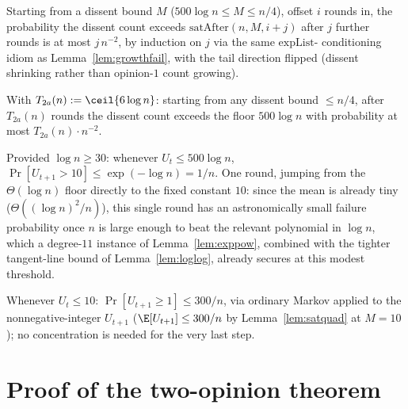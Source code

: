 \begin{lemma}\label{lem:satfail}
  \leanok
  Starting from a dissent bound $M$ ($500\log n\le M\le n/4$), offset $i$
  rounds in, the probability the dissent count exceeds
  $\mathrm{satAfter}(n,M,i+j)$ after $j$ further rounds is at most
  $j\,n^{-2}$, by induction on $j$ via the same $\mathrm{expList}$-
  conditioning idiom as Lemma~\ref{lem:growthfail}, with the tail direction
  flipped (dissent shrinking rather than opinion-$1$ count growing).
\end{lemma}

\begin{lemma}\label{lem:stage2a}
  \leanok
  With $T_{2a}(n) := \ceil{6\log n}$: starting from any dissent bound
  $\le n/4$, after $T_{2a}(n)$ rounds the dissent count exceeds the floor
  $500\log n$ with probability at most $T_{2a}(n)\cdot n^{-2}$.
\end{lemma}

\begin{lemma}[Stage 2b]\label{lem:stage2b}
  \leanok
  Provided $\log n\ge30$: whenever $U_t\le500\log n$,
  $\Pr[U_{t+1}>10] \le \exp(-\log n) = 1/n$. One round, jumping from the
  $\Theta(\log n)$ floor directly to the fixed constant $10$: since the
  mean is already tiny ($\Theta((\log n)^2/n)$), this single round has an
  astronomically small failure probability once $n$ is large enough to beat
  the relevant polynomial in $\log n$, which a degree-$11$ instance of
  Lemma~\ref{lem:exppow}, combined with the tighter tangent-line bound of
  Lemma~\ref{lem:loglog}, already secures at this modest threshold.
\end{lemma}

\begin{lemma}[Stage 2c]\label{lem:stage2c}
  \leanok
  Whenever $U_t\le10$: $\Pr[U_{t+1}\ge1] \le 300/n$, via ordinary Markov
  applied to the nonnegative-integer $U_{t+1}$ ($\E[U_{t+1}]\le300/n$ by
  Lemma~\ref{lem:satquad} at $M=10$); no concentration is needed for the
  very last step.
\end{lemma}

\section{Proof of the two-opinion theorem}\label{sec:proof-main}

